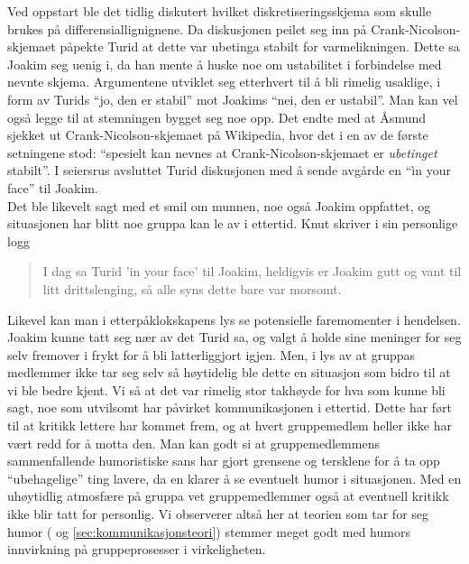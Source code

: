 Ved oppstart ble det tidlig diskutert hvilket diskretiseringsskjema som skulle
brukes på differensiallignignene. Da diskusjonen peilet seg inn på
Crank-Nicolson-skjemaet påpekte Turid at dette var ubetinga stabilt for varmelikningen. Dette
sa Joakim seg uenig i, da han mente å huske noe om ustabilitet i forbindelse med
nevnte skjema. Argumentene utviklet seg etterhvert til å bli rimelig usaklige, i
form av Turids ``jo, den er stabil'' mot Joakims ``nei, den er ustabil''. Man
kan vel også legge til at stemningen bygget seg noe opp. Det endte med at Åsmund
sjekket ut Crank-Nicolson-skjemaet på Wikipedia, hvor det i en av de første
setningene stod: ``spesielt kan nevnes at Crank-Nicolson-skjemaet er
\emph{ubetinget} stabilt''. I seiersrus avsluttet Turid diskusjonen med å sende
avgårde en ``ìn your face'' til Joakim.\\

Det ble likevelt sagt med et smil om munnen, noe også Joakim oppfattet, og
situasjonen har blitt noe gruppa kan le av i ettertid. 
Knut skriver i sin personlige
logg 
\begin{quote}
I dag sa Turid 'in your face' til Joakim, heldigvis er Joakim gutt og
vant til litt drittslenging, så alle syns dette bare var morsomt.
\end{quote}

Likevel kan man i etterpåklokskapens lys se potensielle faremomenter
i hendelsen. Joakim kunne tatt seg nær av det Turid sa, og valgt å holde sine
meninger for seg selv fremover i frykt for å bli latterliggjort igjen. Men, i
lys av at gruppas medlemmer ikke tar seg selv så høytidelig ble dette en
situasjon som bidro til at vi ble bedre kjent. Vi så at det var
rimelig stor takhøyde for hva som kunne bli sagt, noe som utvilsomt har påvirket
kommunikasjonen i ettertid. Dette har ført til at kritikk lettere
har kommet frem, og at hvert gruppemedlem heller ikke har vært redd for å motta
den. Man kan godt si at gruppemedlemmens sammenfallende humoristiske sans har
gjort grensene og tersklene for å ta opp ``ubehagelige'' ting lavere, da en klarer å 
se eventuelt humor i situasjonen. Med en uhøytidlig atmosfære på gruppa vet gruppemedlemmer
også at eventuell kritikk ikke blir tatt for personlig. Vi observerer altså her at teorien 
som tar for seg humor (\cite{jj-humor} og \cref{sec:kommunikasjonsteori}) stemmer 
meget godt med humors innvirkning på gruppeprosesser i virkeligheten.\\



